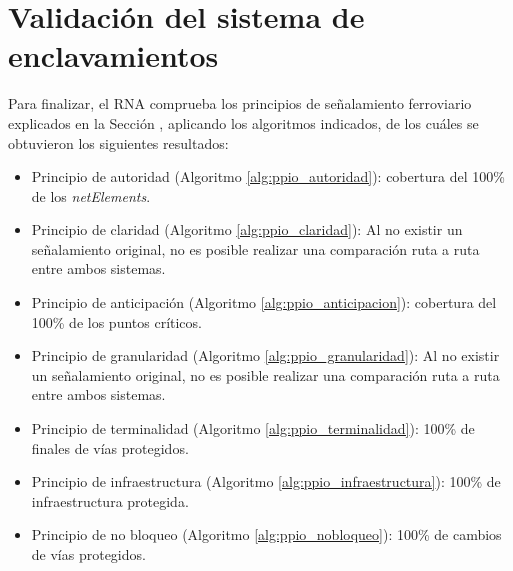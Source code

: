 \section{Validación del sistema de enclavamientos}

   	Para finalizar, el RNA comprueba los principios de señalamiento ferroviario explicados en la Sección \label{sec:validar_principios}, aplicando los algoritmos indicados, de los cuáles se obtuvieron los siguientes resultados:
	
	\begin{itemize}
		\item Principio de autoridad (Algoritmo \ref{alg:ppio_autoridad}): cobertura del 100\% de los \textit{netElements}.
		\item Principio de claridad (Algoritmo \ref{alg:ppio_claridad}): Al no existir un señalamiento original, no es posible realizar una comparación ruta a ruta entre ambos sistemas.
		\item Principio de anticipación (Algoritmo \ref{alg:ppio_anticipacion}): cobertura del 100\% de los puntos críticos.
		\item Principio de granularidad (Algoritmo \ref{alg:ppio_granularidad}): Al no existir un señalamiento original, no es posible realizar una comparación ruta a ruta entre ambos sistemas.
		\item Principio de terminalidad (Algoritmo \ref{alg:ppio_terminalidad}): 100\% de finales de vías protegidos.
		\item Principio de infraestructura (Algoritmo \ref{alg:ppio_infraestructura}): 100\% de infraestructura protegida.
		\item Principio de no bloqueo (Algoritmo \ref{alg:ppio_nobloqueo}): 100\% de cambios de vías protegidos.
	\end{itemize}	
	
